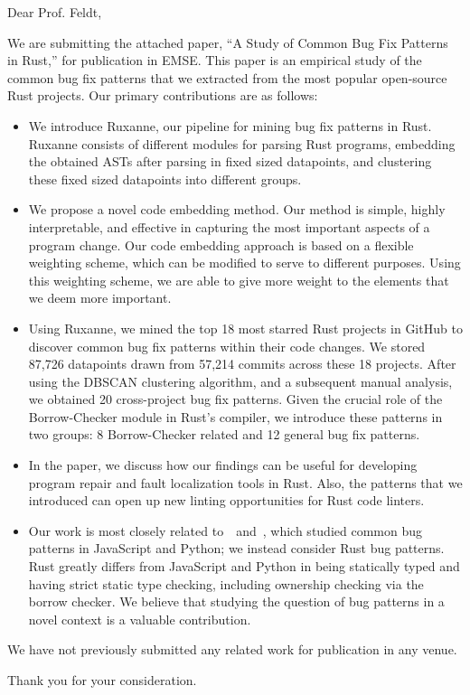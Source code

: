 \documentclass{letter}
\begin{document}
\begin{letter}{}
\opening{Dear Prof. Feldt,}

We are submitting the attached paper, ``A Study of Common Bug Fix Patterns in Rust,'' for publication in EMSE. This paper is an empirical study of the common bug fix patterns that we extracted from the most popular open-source Rust projects. Our primary contributions are as follows:

\begin{itemize}
    \item We introduce Ruxanne, our pipeline for mining bug fix patterns in Rust. Ruxanne consists of different modules for parsing Rust programs, embedding the obtained ASTs after parsing in fixed sized datapoints, and clustering these fixed sized datapoints into different groups. 
    \item We propose a novel code embedding method. Our method is simple, highly interpretable, and effective in capturing the most important aspects of a program change. Our code embedding approach is based on a flexible weighting scheme, which can be modified to serve to different purposes. Using this weighting scheme, we are able to give more weight to the elements that we deem more important. %
    \item Using Ruxanne, we mined the top 18 most starred Rust projects in GitHub to discover common bug fix patterns within their code changes. We stored 87,726 datapoints drawn from 57,214 commits across these 18 projects. After using the DBSCAN clustering algorithm, and a subsequent manual analysis, we obtained 20 cross-project bug fix patterns. Given the crucial role of the Borrow-Checker module in Rust's compiler, we introduce these patterns in two groups: 8 Borrow-Checker related and 12 general bug fix patterns.
    \item In the paper, we discuss how our findings can be useful for developing program repair and fault localization tools in Rust. Also, the patterns that we introduced can open up new linting opportunities for Rust code linters. 
    \item Our work is most closely related to~\cite{hanam2016discovering}~and~\cite{yang2022mining}, which studied common bug patterns in JavaScript and Python; we instead consider Rust bug patterns. Rust greatly differs from JavaScript and Python in being statically typed and having strict static type checking, including ownership checking via the borrow checker. We believe that studying the question of bug patterns in a novel context is a valuable contribution.
\end{itemize}

We have not previously submitted any related work for publication in any venue. 

\closing{Thank you for your consideration.}

\small



\end{letter} 
\end{document}
